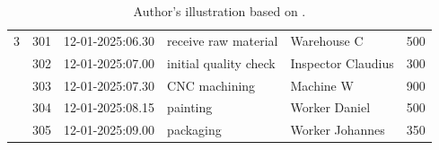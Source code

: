 \begin{table}[htbp]
{\begin{tabular}{r r l l l r}
            \midrule
            3                      & 301                     & 12-01-2025:06.30   & receive raw material  & Warehouse C        & 500           \\
                                   & 302                     & 12-01-2025:07.00   & initial quality check & Inspector Claudius & 300           \\
                                   & 303                     & 12-01-2025:07.30   & CNC machining         & Machine W          & 900           \\
                                   & 304                     & 12-01-2025:08.15   & painting              & Worker Daniel      & 500           \\
                                   & 305                     & 12-01-2025:09.00   & packaging             & Worker Johannes    & 350           \\
            \bottomrule
        \end{tabular}%
    }
    \caption*{Author's illustration based on \textcite{van2016data}.}
\end{table}

